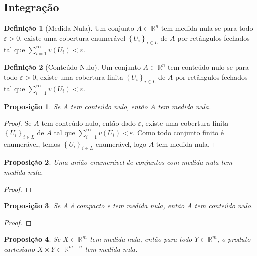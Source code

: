 \documentclass{article}
\theoremstyle{plain}
\newtheorem{prop}{Proposição}[section]
\theoremstyle{definition}
\newtheorem{definicao}{Definição}[section]
\theoremstyle{remark}
\begin{document}
\subsection{Integração}


\begin{definicao}[Medida Nula]
	Um conjunto $A\subset \mathbb{R}^n$ tem medida nula se para todo $\varepsilon>0$,  existe uma cobertura enumerável    $\left\{ U_i \right\}_{i\in L}$ de $A$ por retângulos fechados tal que $\displaystyle\sum_{i = 1}^{\infty} v\left(U_i\right) < \varepsilon$.
\end{definicao}

\begin{definicao}[Conteúdo Nulo]
	Um conjunto $A\subset \mathbb{R}^n$ tem conteúdo nulo se para todo $\varepsilon>0$,  existe uma cobertura finita    $\left\{ U_i \right\}_{i\in L}$ de  $A$ por retângulos fechados tal que $\displaystyle\sum_{i = 1}^{\infty} v\left(U_i\right) < \varepsilon$.
\end{definicao}
\begin{prop}
	Se $A$ tem conteúdo nulo, então $A$ tem medida nula.
\end{prop}
\begin{proof}
	Se $A$ tem conteúdo nulo, então dado $\varepsilon$,  existe uma cobertura finita $\left\{ U_i \right\}_{i \in L}$ de $A$ tal que $\displaystyle\sum_{i = 1}^{\infty} v\left(U_i\right) < \varepsilon$. Como todo conjunto finito é enumerável, temos $\left\{ U_i \right\}_{i\in L}$ enumerável, logo $A$ tem medida nula.
\end{proof}
\begin{prop}
	Uma união enumerável de conjuntos com medida nula tem medida nula.
\end{prop}
\begin{proof}
\end{proof}
\begin{prop}
	Se $A$ é compacto e tem medida nula, então $A$ tem conteúdo nulo.
\end{prop}
\begin{proof}
\end{proof}
\begin{prop}
	Se $X\subset \mathbb{R}^m$ tem medida nula, então  para todo $Y \subset \mathbb{R}^m$, o produto cartesiano $X\times Y \subset \mathbb{R}^{m+n}$ tem medida nula.
\end{prop}
\end{document}

